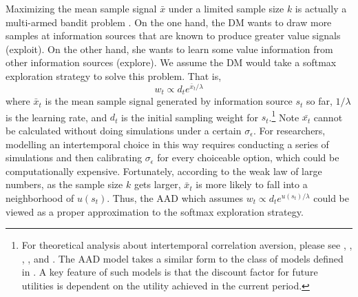 \documentclass[
  12pt,
]{article}
\begin{document}
Maximizing the mean sample signal \(\bar{x}\) under a limited sample
size \(k\) is actually a multi-armed bandit problem
\citep[][Ch.2]{sutton2018reinforcement}. On the one hand, the DM wants
to draw more samples at information sources that are known to produce
greater value signals (exploit). On the other hand, she wants to learn
some value information from other information sources (explore). We
assume the DM would take a softmax exploration strategy to solve this
problem. That is,\[
w_t \propto d_t e^{\bar{x}_t/\lambda}
\]where \(\bar{x}_t\) is the mean sample signal generated by information
source \(s_t\) so far, \(1/\lambda\) is the learning rate, and \(d_t\)
is the initial sampling weight for \(s_t\).\footnote{For theoretical
  analysis about intertemporal correlation aversion, please see
  \citet{epstein1983stationary}, \citet{epstein1989substitution},
  \citet{weil1990nonexpected}, \citet{bommier2005risk}, and
  \citet{bommier2017monotone}. The AAD model takes a similar form to the
  class of models defined in \citet{epstein1983stationary}. A key
  feature of such models is that the discount factor for future
  utilities is dependent on the utility achieved in the current period.}
Note \(\bar{x_t}\) cannot be calculated without doing simulations under
a certain \(\sigma_\epsilon\). For researchers, modelling an
intertemporal choice in this way requires conducting a series of
simulations and then calibrating \(\sigma_\epsilon\) for every
choiceable option, which could be computationally expensive.
Fortunately, according to the weak law of large numbers, as the sample
size \(k\) gets larger, \(\bar{x}_t\) is more likely to fall into a
neighborhood of \(u(s_t)\). Thus, the AAD which assumes
\(w_t \propto d_t e^{u(s_t)/\lambda}\) could be viewed as a proper
approximation to the softmax exploration strategy.
\end{document}
